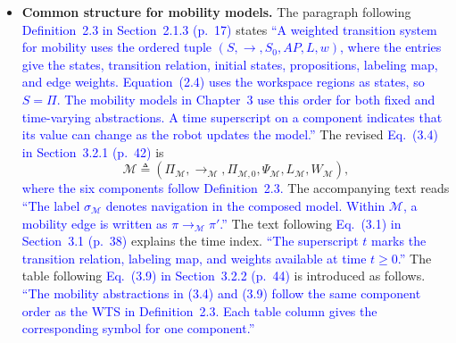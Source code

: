 \documentclass[11pt]{article}
\newcommand{\change}[1]{\textcolor{blue}{#1}}
\begin{document}
\begin{itemize}
\item \textbf{Common structure for mobility models.} The paragraph following
\change{Definition~2.3 in Section~2.1.3 (p.~17)} states
\change{``A weighted transition system for mobility uses the ordered tuple
$(S,\longrightarrow,S_0,AP,L,w)$, where the entries give the states,
transition relation, initial states, propositions, labeling map, and edge weights.
Equation~(2.4) uses the workspace regions as states, so $S=\Pi$.
The mobility models in Chapter~3 use this order for both
fixed and time-varying abstractions. A time superscript on a component
indicates that its value can change as the robot updates the model.''}
The revised \change{Eq.~(3.4) in Section~3.2.1 (p.~42)} is
{\color{blue}
\begin{equation*}
\mathcal{M} \triangleq
(\Pi_{\mathcal{M}}, \longrightarrow_{\mathcal{M}},
 \Pi_{\mathcal{M},0}, \Psi_{\mathcal{M}}, L_{\mathcal{M}}, W_{\mathcal{M}}),
\tag{3.4}
\end{equation*}}
\change{where the six components follow Definition~2.3.}
The accompanying text reads
\change{``The label $\sigma_{\mathcal{M}}$ denotes navigation in the composed model.
Within $\mathcal{M}$, a mobility edge is written as
$\pi\longrightarrow_{\mathcal{M}}\pi'$.''}
The text following \change{Eq.~(3.1) in Section~3.1 (p.~38)} explains the
time index.
\change{``The superscript $t$
marks the transition relation, labeling map, and weights available at time
$t \geq 0$.''}
The table following \change{Eq.~(3.9) in Section~3.2.2 (p.~44)} is
introduced as follows.
\change{``The mobility abstractions in (3.4) and (3.9) follow the
same component order as the WTS in Definition~2.3.
Each table column gives the corresponding symbol for one component.''}


\end{itemize}
\end{document}
